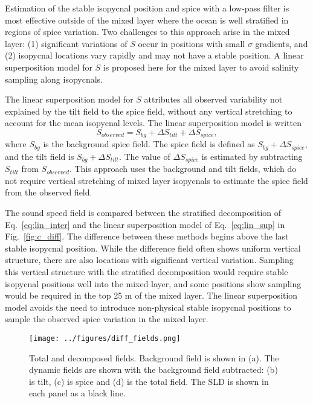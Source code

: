 \documentclass[preprint,NumberedRefs]{JASA}
\begin{document}
Estimation of the stable isopycnal position and spice with a low-pass filter is most effective outside of the mixed layer where the ocean is well stratified in regions of spice variation. Two challenges to this approach arise in the mixed layer: (1) significant variations of $S$ occur in positions with small $\sigma$ gradients, and (2) isopycnal locations vary rapidly and may not have a stable position. A linear superposition model for $S$ is proposed here for the mixed layer to avoid salinity sampling along isopycnals.

The linear superposition model for $S$ attributes all observed variability not explained by the tilt field to the spice field, without any vertical stretching to account for the mean isopycnal levels. The linear superposition model is written
\begin{equation}
    S_{observed} = S_{bg} + \Delta S_{tilt} + \Delta S_{spice},
    \label{eq:lin_sup}
\end{equation}
where $S_{bg}$ is the background spice field. The spice field is defined as $S_{bg} + \Delta S_{spice}$, and the tilt field is $S_{bg} + \Delta S_{tilt}$. The value of $\Delta S_{spice}$ is estimated by subtracting $S_{tilt}$ from $S_{observed}$. This approach uses the background and tilt fields, which do not require vertical stretching of mixed layer isopycnals to estimate the spice field from the observed field.

The sound speed field is compared between the stratified decomposition of Eq.~\eqref{eq:lin_inter} and the linear superposition model of Eq.~\eqref{eq:lin_sup} in Fig.~\ref{fig:c_diff}. The difference between these methods begins above the last stable isopycnal position. While the difference field often shows uniform vertical structure, there are also locations with significant vertical variation. Sampling this vertical structure with the stratified decomposition would require stable isopycnal positions well into the mixed layer, and some positions show sampling would be required in the top 25 m of the mixed layer. The linear superposition model avoids the need to introduce non-physical stable isopycnal positions to sample the observed spice variation in the mixed layer.

\begin{figure}
\texttt{[image: ../figures/diff\_fields.png]}
        \caption{\label{fig:c_fields}{Total and decomposed fields. Background field is shown in (a). The dynamic fields are shown with the background field subtracted: (b) is tilt, (c) is spice and (d) is the total field. The SLD is shown in each panel as a black line.}}
\end{figure}
\end{document}
